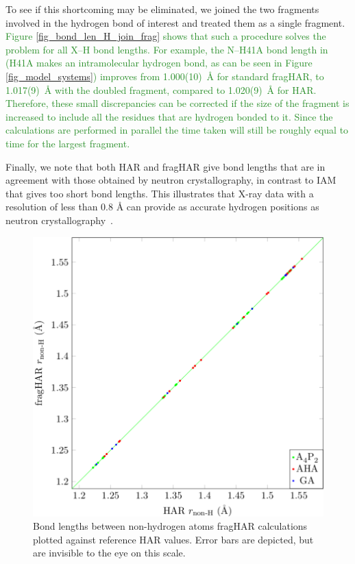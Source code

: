 \documentclass[preprint,dvipsnames]{iucr}              %
\newcommand{\changed}[1]{\textcolor{ForestGreen}{#1}}
\begin{document}
To see if this shortcoming may be eliminated, we joined the two 
fragments involved in the hydrogen bond of interest
and treated them as a single fragment. 
\changed{Figure \ref{fig_bond_len_H_join_frag} shows that such 
a procedure solves the problem for all X--H bond lengths. 
For example, the N--H41A bond length in \ce{A4P2} 
(H41A makes an intramolecular 
hydrogen bond, as can be seen in Figure \ref{fig_model_systems}) 
improves from 1.000(10)~\AA{} for standard fragHAR, to 1.017(9)~\AA{} 
with the doubled fragment, compared to 1.020(9)~\AA{} for HAR. Therefore,
these small discrepancies can be corrected if
the size of the fragment is increased to include all the
residues that are hydrogen bonded to it. Since the calculations
are performed in parallel the time taken will still be roughly 
equal to time for the largest fragment.}

Finally, we note that both HAR and fragHAR give  bond 
lengths that are in agreement with those obtained by neutron 
crystallography, in contrast to IAM that gives too short 
 bond lengths. This illustrates that X-ray data with 
a resolution of less than 0.8 {\AA} can provide as accurate 
hydrogen positions as neutron crystallography~\cite{jayatilaka2008x,woinska2014hirshfeld,%
capelli2014hirshfeld,fugel2018probing}. 




		
\begin{figure}
 \centering
 \includegraphics[width=0.8\linewidth]{graph_bond_non_H.png}
 \caption{Bond lengths between non-hydrogen atoms fragHAR 
 calculations plotted against reference HAR values. Error bars 
 are depicted, but are invisible to the eye on this scale.}
		\label{fig_bond_len_non_H}
\end{figure}
		
\end{document}
